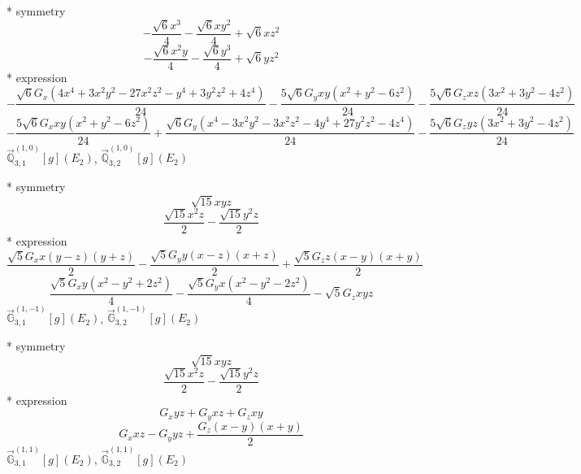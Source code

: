 \documentclass[fleqn,8pt]{jsarticle}
\begin{document}
\noindent\quad ** symmetry
\begin{dmath*}
- \frac{\sqrt{6} x^{3}}{4} - \frac{\sqrt{6} x y^{2}}{4} + \sqrt{6} x z^{2}
\end{dmath*}
\begin{dmath*}
- \frac{\sqrt{6} x^{2} y}{4} - \frac{\sqrt{6} y^{3}}{4} + \sqrt{6} y z^{2}
\end{dmath*}
\noindent\quad ** expression
\begin{dmath*}
- \frac{\sqrt{6} G_{x} \left(4 x^{4} + 3 x^{2} y^{2} - 27 x^{2} z^{2} - y^{4} + 3 y^{2} z^{2} + 4 z^{4}\right)}{24} - \frac{5 \sqrt{6} G_{y} x y \left(x^{2} + y^{2} - 6 z^{2}\right)}{24} - \frac{5 \sqrt{6} G_{z} x z \left(3 x^{2} + 3 y^{2} - 4 z^{2}\right)}{24}
\end{dmath*}
\begin{dmath*}
- \frac{5 \sqrt{6} G_{x} x y \left(x^{2} + y^{2} - 6 z^{2}\right)}{24} + \frac{\sqrt{6} G_{y} \left(x^{4} - 3 x^{2} y^{2} - 3 x^{2} z^{2} - 4 y^{4} + 27 y^{2} z^{2} - 4 z^{4}\right)}{24} - \frac{5 \sqrt{6} G_{z} y z \left(3 x^{2} + 3 y^{2} - 4 z^{2}\right)}{24}
\end{dmath*}
\noindent\quad $\vec{\mathbb{Q}}_{3,1}^{(1,0)}[g](E_{2})$, $\vec{\mathbb{Q}}_{3,2}^{(1,0)}[g](E_{2})$

\noindent\quad ** symmetry
\begin{dmath*}
\sqrt{15} x y z
\end{dmath*}
\begin{dmath*}
\frac{\sqrt{15} x^{2} z}{2} - \frac{\sqrt{15} y^{2} z}{2}
\end{dmath*}
\noindent\quad ** expression
\begin{dmath*}
\frac{\sqrt{5} G_{x} x \left(y - z\right) \left(y + z\right)}{2} - \frac{\sqrt{5} G_{y} y \left(x - z\right) \left(x + z\right)}{2} + \frac{\sqrt{5} G_{z} z \left(x - y\right) \left(x + y\right)}{2}
\end{dmath*}
\begin{dmath*}
\frac{\sqrt{5} G_{x} y \left(x^{2} - y^{2} + 2 z^{2}\right)}{4} - \frac{\sqrt{5} G_{y} x \left(x^{2} - y^{2} - 2 z^{2}\right)}{4} - \sqrt{5} G_{z} x y z
\end{dmath*}
\noindent\quad $\vec{\mathbb{G}}_{3,1}^{(1,-1)}[g](E_{2})$, $\vec{\mathbb{G}}_{3,2}^{(1,-1)}[g](E_{2})$

\noindent\quad ** symmetry
\begin{dmath*}
\sqrt{15} x y z
\end{dmath*}
\begin{dmath*}
\frac{\sqrt{15} x^{2} z}{2} - \frac{\sqrt{15} y^{2} z}{2}
\end{dmath*}
\noindent\quad ** expression
\begin{dmath*}
G_{x} y z + G_{y} x z + G_{z} x y
\end{dmath*}
\begin{dmath*}
G_{x} x z - G_{y} y z + \frac{G_{z} \left(x - y\right) \left(x + y\right)}{2}
\end{dmath*}
\noindent\quad $\vec{\mathbb{G}}_{3,1}^{(1,1)}[g](E_{2})$, $\vec{\mathbb{G}}_{3,2}^{(1,1)}[g](E_{2})$
\end{document}
